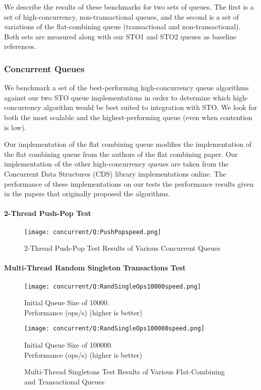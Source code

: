 We describe the results of these benchmarks for two sets of queues. The first is a set of high-concurrency, non-transactional queues, and the second is a set of variations of the flat-combining queue (transactional and non-transactional). Both sets are measured along with our STO1 and STO2 queues as baseline references.

\subsubsection{Concurrent Queues}

We benchmark a set of the best-performing high-concurrency queue algorithms against our two STO queue implementations in order to determine which high-concurrency algorithm would be best suited to integration with STO. We look for both the most scalable and the highest-performing queue (even when contention is low).
 
 Our implementation of the flat combining queue modifies the implementation of the flat combining queue from the authors of the flat combining paper\cite{flatcombining}. Our implementation of the other high-concurrency queues are taken from the Concurrent Data Structures (CDS) library implementations online\cite{libcds}. The performance of these implementations on our tests the performance results given in the papers that originally proposed the algorithms.


\paragraph{2-Thread Push-Pop Test}
\begin{figure}[ht!]
\centering
    \texttt{[image: concurrent/Q:PushPopspeed.png]}
\caption{2-Thread Push-Pop Test Results of Various Concurrent Queues}
\label{fig:concurrent_queues}
\end{figure}

\paragraph{Multi-Thread Random Singleton Transactions Test}
\begin{figure}[ht!]
\centering
    \begin{minipage}{0.45\textwidth}
        \centering
        \texttt{[image: concurrent/Q:RandSingleOps10000speed.png]}
        \caption*{Initial Queue Size of 10000.\\Performance (ops/s) (higher is better)}
    \end{minipage}
    \begin{minipage}{0.45\textwidth}
        \centering
        \texttt{[image: concurrent/Q:RandSingleOps100000speed.png]}
        \caption*{Initial Queue Size of 100000.\\Performance (ops/s) (higher is better)}
    \end{minipage}
\caption{Multi-Thread Singletons Test Results of Various Flat-Combining and Transactional Queues}
\label{fig:concurrent_queues}
\end{figure}

